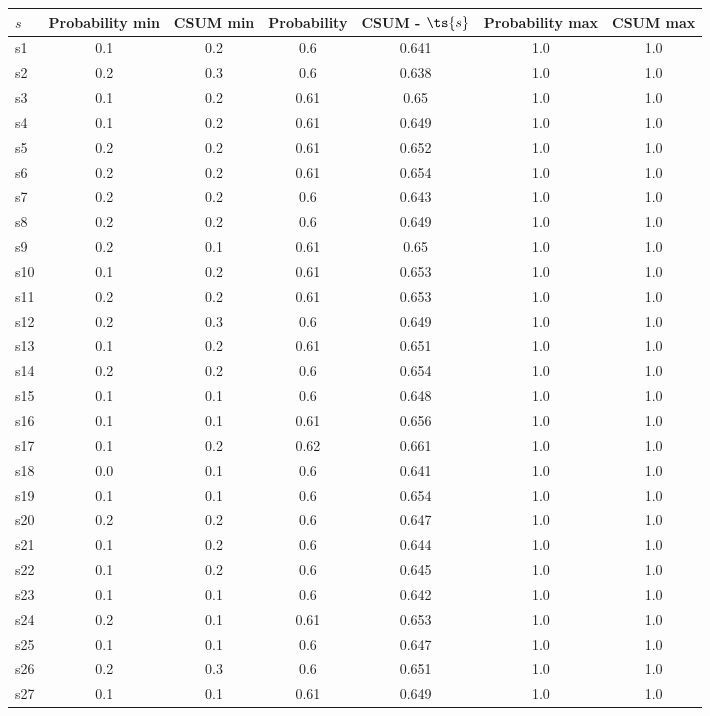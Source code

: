 \documentclass{article}
\begin{document}
\noindent\begin{tabular}{|l|c|c|c|c|c|c|}
\hline
$s$& Probability min & CSUM min & Probability & CSUM - $\ts{s}$ & Probability max & CSUM max\\
\hline
s1 &0.1 & 0.2 & 0.6 & 0.641 & 1.0 & 1.0\\
\hline
s2 &0.2 & 0.3 & 0.6 & 0.638 & 1.0 & 1.0\\
\hline
s3 &0.1 & 0.2 & 0.61 & 0.65 & 1.0 & 1.0\\
\hline
s4 &0.1 & 0.2 & 0.61 & 0.649 & 1.0 & 1.0\\
\hline
s5 &0.2 & 0.2 & 0.61 & 0.652 & 1.0 & 1.0\\
\hline
s6 &0.2 & 0.2 & 0.61 & 0.654 & 1.0 & 1.0\\
\hline
s7 &0.2 & 0.2 & 0.6 & 0.643 & 1.0 & 1.0\\
\hline
s8 &0.2 & 0.2 & 0.6 & 0.649 & 1.0 & 1.0\\
\hline
s9 &0.2 & 0.1 & 0.61 & 0.65 & 1.0 & 1.0\\
\hline
s10 &0.1 & 0.2 & 0.61 & 0.653 & 1.0 & 1.0\\
\hline
s11 &0.2 & 0.2 & 0.61 & 0.653 & 1.0 & 1.0\\
\hline
s12 &0.2 & 0.3 & 0.6 & 0.649 & 1.0 & 1.0\\
\hline
s13 &0.1 & 0.2 & 0.61 & 0.651 & 1.0 & 1.0\\
\hline
s14 &0.2 & 0.2 & 0.6 & 0.654 & 1.0 & 1.0\\
\hline
s15 &0.1 & 0.1 & 0.6 & 0.648 & 1.0 & 1.0\\
\hline
s16 &0.1 & 0.1 & 0.61 & 0.656 & 1.0 & 1.0\\
\hline
s17 &0.1 & 0.2 & 0.62 & 0.661 & 1.0 & 1.0\\
\hline
s18 &0.0 & 0.1 & 0.6 & 0.641 & 1.0 & 1.0\\
\hline
s19 &0.1 & 0.1 & 0.6 & 0.654 & 1.0 & 1.0\\
\hline
s20 &0.2 & 0.2 & 0.6 & 0.647 & 1.0 & 1.0\\
\hline
s21 &0.1 & 0.2 & 0.6 & 0.644 & 1.0 & 1.0\\
\hline
s22 &0.1 & 0.2 & 0.6 & 0.645 & 1.0 & 1.0\\
\hline
s23 &0.1 & 0.1 & 0.6 & 0.642 & 1.0 & 1.0\\
\hline
s24 &0.2 & 0.1 & 0.61 & 0.653 & 1.0 & 1.0\\
\hline
s25 &0.1 & 0.1 & 0.6 & 0.647 & 1.0 & 1.0\\
\hline
s26 &0.2 & 0.3 & 0.6 & 0.651 & 1.0 & 1.0\\
\hline
s27 &0.1 & 0.1 & 0.61 & 0.649 & 1.0 & 1.0\\

\end{tabular}
\end{document}

